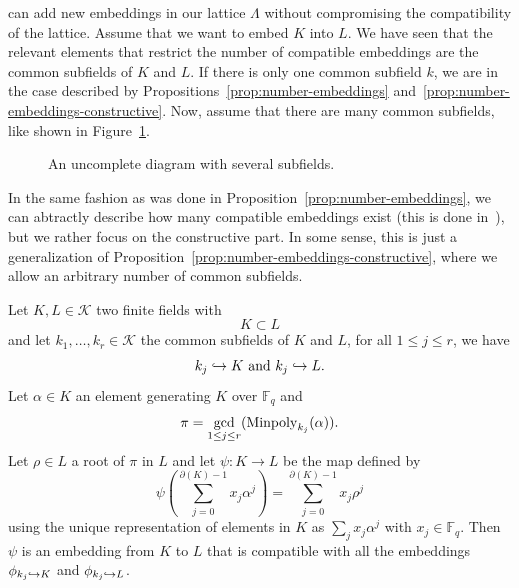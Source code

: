 can add new embeddings in our lattice $\Lambda$ without compromising the
compatibility of the lattice. Assume that we want to embed $K$ into $L$. We have
seen that the relevant elements that restrict the number of compatible
embeddings are the common subfields of $K$ and $L$. If there is only one common
subfield $k$, we are in the case described by
Propositions~\ref{prop:number-embeddings}
and~\ref{prop:number-embeddings-constructive}. Now, assume that there are many
common subfields, like shown in Figure~\ref{fig:uncomplete-sev}.%
\begin{figure}
  \centering
  \caption{An uncomplete diagram with several subfields.}
  \label{fig:uncomplete-sev}
\end{figure}
In the same fashion as was done in Proposition~\ref{prop:number-embeddings}, we
can abtractly describe how many compatible embeddings exist (this is done
in~\cite[Section 2.5]{BCS97}), but we rather focus on the constructive part. In
some sense, this is just a generalization of
Proposition~\ref{prop:number-embeddings-constructive}, where we allow an
arbitrary number of common subfields.
\begin{prop}
  \label{prop:several-subfields}
  Let $K, L\in\mathcal K$ two finite fields with
  \[
    K\subset L
  \]
  and let $k_1, \dots, k_r\in\mathcal K$ the common subfields of $K$ and $L$,
  \ie for all $1\leq j\leq r$, we have
  \[
    k_j\hookrightarrow K\text{ and }k_j\hookrightarrow L.
  \]
  Let $\alpha\in K$ an element generating $K$ over $\mathbb{F}_q$ and
  \[
    \pi = \gcd_{1\leq j\leq r}(\operatorname{Minpoly}_{k_j}(\alpha)).
  \]
  Let $\rho\in L$ a root of $\pi$ in $L$ and let $\psi:K\to L$ be the map
  defined by
  \[
    \psi(\sum_{j=0}^{\partial(K)-1}x_j\alpha^j) =
    \sum_{j=0}^{\partial(K)-1}x_j\rho^j
  \]
  using the unique representation of elements in $K$ as $\sum_j x_j\alpha^j$
  with $x_j\in\mathbb{F}_q$. Then $\psi$ is an embedding from $K$ to $L$ that is
  compatible with all the embeddings $\phi_{k_j\hookrightarrow K}$ and $\phi_{k_j\hookrightarrow L}$.
\end{prop}
